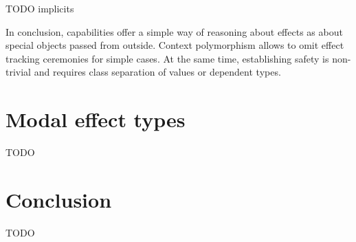 \documentclass[conference]{IEEEtran}
\begin{document}
    TODO implicits %

    In conclusion, capabilities offer a simple way of reasoning about effects as about special objects passed from outside.
    Context polymorphism allows to omit effect tracking ceremonies for simple cases.
    At the same time, establishing safety is non-trivial and requires class separation of values or dependent types.


    \section{Modal effect types} \label{sec:modal}



    TODO \cite{convent2020doo}\cite{tang2024modal}




    \section{Conclusion}

    TODO %


%



    
    
\end{document}
